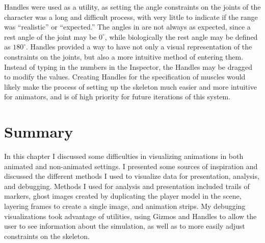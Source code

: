 Handles were used as a utility, as setting the angle constraints on the joints of the character was a long and difficult process, with very little to indicate if the range was ``realistic'' or ``expected.'' The angles in \unity{} are not always as expected, since a rest angle of the joint may be $0^\circ$, while biologically the rest angle may be defined as $180^\circ$.  Handles provided a way to have not only a visual representation of the constraints on the joints, but also a more intuitive method of entering them.  Instead of typing in the numbers in the \unity{} Inspector, the Handles may be dragged to modify the values.  Creating Handles for the specification of muscles would likely make the process of setting up the skeleton much easier and more intuitive for animators, and is of high priority for future iterations of this system.

\section{Summary}
In this chapter I discussed some difficulties in visualizing animations in both animated and non-animated settings.  I presented some sources of inspiration and discussed the different methods I used to visualize data for presentation, analysis, and debugging.  Methods I used for analysis and presentation included trails of markers, ghost images created by duplicating the player model in the scene, layering frames to create a single image, and animation strips.  My debugging visualizations took advantage of \unity{} utilities, using Gizmos and Handles to allow the user to see information about the simulation, as well as to more easily adjust constraints on the skeleton.
\label{section:vis_summary}
